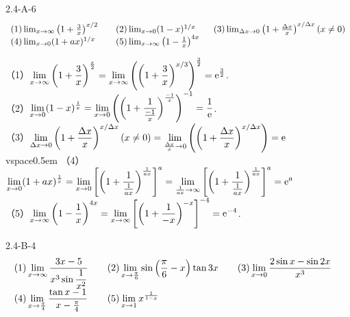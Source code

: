 \begin{example}{2.4-A-6}{}
    \vspace{-5pt}\[\begin{array}{l@{\quad}l@{\quad}l}
    (1)\lim_{x\to\infty}\left(1+\frac{3}{x}\right)^{x/2}\quad&(2)\lim_{x\to0}(1-x)^{1/x}\quad&(3)\lim_{\Delta x\to0}\left(1+\frac{\Delta x}{x}\right)^{x/\Delta x}(x\neq0)\\(4)\lim_{x\to0}(1+ax)^{1/x}\quad&(5)\lim_{x\to\infty}\left(1-\frac{1}{x}\right)^{4x}\end{array}\]
\end{example}
\begin{solution}
    （1）$\displaystyle\lim_{x\to \infty}\left(1+\dfrac{3}{x}\right)^{\frac{x}{2}}=\lim_{x\to \infty}\left(\left(1+\dfrac{3}{x}\right)^{x/3}\right)^{\frac{3}{2}}=\text{e}^{\frac32}$.\\\vspace{0.5em}
    （2）$\displaystyle\lim_{x\to 0}(1-x)^{\frac1{x}}=\lim_{x\to 0}\left(\left(1+\frac{1}{\frac{-1}{x}}\right)^{\frac{-1}{x}}\right)^{-1}=\dfrac{1}{\text{e}}$.\\\vspace{0.5em}
    （3）$\displaystyle\lim_{\Delta x\to 0}\left(1+\frac{\Delta x}{x}\right)^{x/\Delta x}(x\neq0)=\lim_{\frac{\Delta x}{x}\to 0}\left(\left(1+\frac{\Delta x}{x}\right)^{x/\Delta x}\right)=\text{e}$\\vspace{0.5em}
    （4）$\displaystyle\lim_{x\to 0}(1+ax)^{\frac1{x}}=\lim_{x\to 0}\left[\left(1+\dfrac{1}{\frac{1}{ax}}\right)^{\frac{1}{ax}}\right]^{a}=\lim_{\frac1{ax}\to\infty}\left[\left(1+\dfrac{1}{\frac{1}{ax}}\right)^{\frac{1}{ax}}\right]^{a}=\text{e}^a$\\\vspace{0.5em}
    （5）$\displaystyle\lim_{x\to\infty}\left(1-\frac{1}{x}\right)^{4x}=\lim_{x\to\infty}\left[\left(1+\frac{1}{-x}\right)^{-x}\right]^{-4}=\text{e}^{-4}$.
\end{solution}
\begin{example}{2.4-B-4}{}
    \vspace{-5pt}\[\begin{array}{l@{\quad}l@{\quad}l}
    (1)\displaystyle\lim_{x\to\infty}\dfrac{3x-5}{x^3\sin\dfrac{1}{x^2}}\quad&
    (2)\displaystyle\lim_{x\rightarrow \frac{\pi}{6}} \sin \left(\frac{\pi}{6}-x\right) \tan 3 x\quad&
    (3)\displaystyle\lim_{x\rightarrow 0} \frac{2\sin x-\sin 2x}{x^{3}}\quad\\
    (4)\displaystyle\lim_{x\rightarrow \frac{\pi}{4}} \frac{\tan x-1}{x-\frac{\pi}{4}}\quad&
    (5)\displaystyle\lim_{x\rightarrow 1} x^{\frac{1}{1-x}}
\end{array}\]
\end{example}
